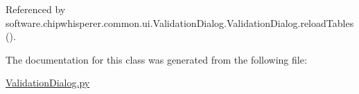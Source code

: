 Referenced by software.\+chipwhisperer.\+common.\+ui.\+Validation\+Dialog.\+Validation\+Dialog.\+reload\+Tables().



The documentation for this class was generated from the following file\+:\begin{DoxyCompactItemize}
\item 
\hyperlink{ValidationDialog_8py}{Validation\+Dialog.\+py}\end{DoxyCompactItemize}
